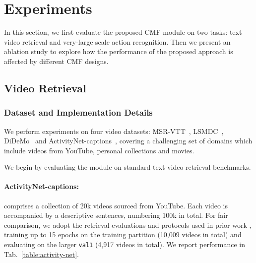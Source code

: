 \section{Experiments}


In this section, we first evaluate the proposed CMF module on two tasks: text-video retrieval and very-large scale action recognition. Then we present an ablation study to explore how the performance of the proposed approach is affected by different CMF designs. 




\subsection{Video Retrieval}

\subsubsection{Dataset and Implementation Details}

We perform experiments on four video datasets:  MSR-VTT~\cite{xu2016msr}, LSMDC~\cite{rohrbach2015dataset}, DiDeMo~\cite{anne2017localizing} and ActivityNet-captions~\cite{krishna2017dense}, covering a challenging set of domains which include videos from YouTube, personal collections and movies. 

We begin by evaluating the module on standard text-video retrieval benchmarks.  


\paragraph{ActivityNet-captions:} \cite{krishna2017dense} comprises a collection of 20k videos sourced from YouTube.  Each video is accompanied by a descriptive sentences, numbering 100k in total.  For fair comparison, we adopt the retrieval evaluations and protocols used in prior work \cite{zhang2018cross,liu2019use}, training up to 15 epochs on the training partition (10,009 videos in total) and evaluating on the larger \texttt{val1} (4,917 videos in total).  We report performance in Tab.~\ref{table:activity-net}.


